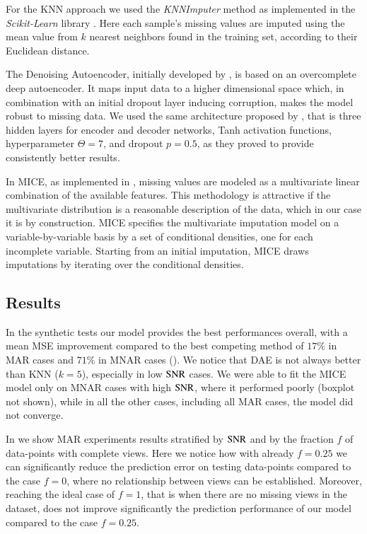 For the KNN approach we used the \textit{KNNImputer} method as implemented in the \textit{Scikit-Learn} library \citep{sklearn}.
Here each sample's missing values are imputed using the mean value from $k$ nearest neighbors found in the training set, according to their Euclidean distance.

The Denoising Autoencoder, initially developed by \cite{Vincent2008}, is based on an overcomplete deep autoencoder.
It maps input data to a higher dimensional space which, in combination with an initial dropout layer inducing corruption, makes the model robust to missing data.
We used the same architecture proposed by \cite{dae}, that is three hidden layers for encoder and decoder networks, Tanh activation functions, hyperparameter $\Theta=7$, and dropout $p=0.5$, as they proved to provide consistently better results.

In MICE, as implemented in \cite{mice}, missing values are modeled as a multivariate linear combination of the available features.
This methodology is attractive if the multivariate distribution is a reasonable description of the data, which in our case it is by construction.
MICE specifies the multivariate imputation model on a variable-by-variable basis by a set of conditional densities, one for each incomplete variable.
Starting from an initial imputation, MICE draws imputations by iterating over the conditional densities.

\subsection{Results}


In the synthetic tests our model provides the best performances overall, with a mean MSE improvement compared to the best competing method of $17\%$ in MAR cases and $71\%$ in MNAR cases ().
We notice that DAE is not always better than KNN ($k=5$), especially in low $\operatorname{SNR}$ cases.
We were able to fit the MICE model only on MNAR cases with high $\operatorname{SNR}$, where it performed poorly (boxplot not shown), while in all the other cases, including all MAR cases, the model did not converge.

In  we show MAR experiments results stratified by $\operatorname{SNR}$ and by the fraction $f$ of data-points with complete views.
Here we notice how with already $f = 0.25$ we can significantly reduce the prediction error on testing data-points compared to the case $f=0$, where no relationship between views can be established.
Moreover, reaching the ideal case of $f=1$, that is when there are no missing views in the dataset, does not improve significantly the prediction performance of our model compared to the case $f = 0.25$.

